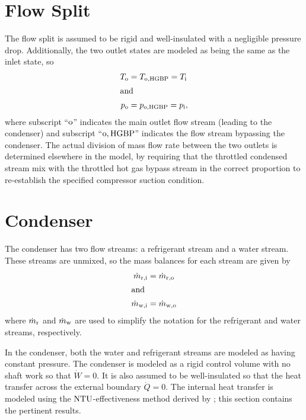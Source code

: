 \section{Flow Split} \label{sec:FlowSplit}
The flow split is assumed to be rigid and well-insulated with a negligible pressure drop.
Additionally, the two outlet states are modeled as being the same as the inlet state, so
\begin{align}
  T_{\text{o}} &= T_{\text{o},\text{HGBP}} = T_{\text{i}} \\
  \shortintertext{and}
  p_{\text{o}} &= p_{\text{o},\text{HGBP}} = p_{\text{i}},
\end{align}
where subscript ``$\text{o}$'' indicates the main outlet flow stream (leading to the condenser)
and subscript ``$\text{o},\text{HGBP}$'' indicates the flow stream bypassing the condenser.
The actual division of mass flow rate between the two outlets is determined elsewhere in the model, 
by requiring that the throttled condensed stream mix with the throttled hot gas bypass
stream in the correct proportion to re-establish the specified compressor suction condition.

\section{Condenser} \label{sec:Condenser}
The condenser has two flow streams: a refrigerant stream and a water stream.
These streams are unmixed, so the mass balances for each stream are given by
\begin{align}
  \dot{m}_{\rfr,\inl} &= \dot{m}_{\rfr,\out} \\%
  \shortintertext{and}
  \dot{m}_{\wat,\inl} &= \dot{m}_{\wat,\out} %
\end{align}
where $\dot{m}_{\text{r}}$ and $\dot{m}_{\text{w}}$ are used to simplify the notation
for the refrigerant and water streams, respectively.

In the condenser, both the water and refrigerant streams are modeled as having constant pressure.
The condenser is modeled as a rigid control volume with no shaft work so that $\dot{W}=0$.
It is also assumed to be well-insulated so that the heat transfer across the external boundary $\dot{Q}=0$.
The internal heat transfer is modeled using the $\mathrm{NTU}$-effectiveness method 
derived by \textcite{incropera2007}; this section contains the pertinent results.

